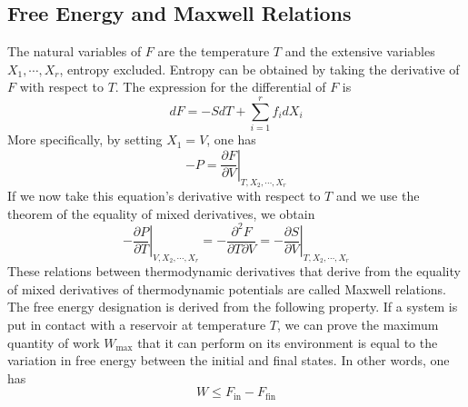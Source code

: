 \documentclass[cyan]{elegantnote}
\begin{document}
\subsection{Free Energy and Maxwell Relations}
The natural variables of $F$ are the temperature $T$ and the extensive variables $X_1,\cdots,X_r$, entropy excluded. Entropy can be obtained by taking the derivative of $F$ with respect to $T$. The expression for the differential of $F$ is
\[dF = -SdT + \sum_{i = 1}^{r} f_i dX_i\]
More specifically, by setting $X_1 = V$, one has
\[-P =\left. \frac{\partial F}{\partial V} \right|_{T,X_2,\cdots,X_r}\]
If we now take this equation's derivative with respect to $T$ and we use the theorem of the equality of mixed derivatives, we obtain
\[\left. -\frac{\partial P}{\partial T} \right|_{V,X_2,\cdots,X_r} = -\frac{\partial^2 F}{\partial T \partial V} = \left. -\frac{\partial S}{\partial V} \right|_{T,X_2,\cdots,X_r}\]
These relations between thermodynamic derivatives that derive from the equality of mixed derivatives of thermodynamic potentials are called Maxwell relations.
\\
The free energy designation is derived from the following property. If a system is put in contact with a reservoir at temperature $T$, we can prove the maximum quantity of work $W_{\mathrm{max}}$ that it can perform on its environment is equal to the variation in free energy between the initial and final states. In other words, one has
\[W \leq F_{\mathrm{in}} - F_{\mathrm{fin}}\]
\end{document}
